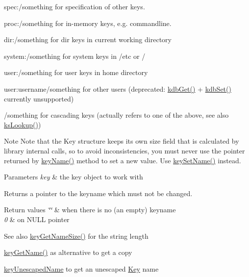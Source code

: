\begin{DoxyItemize}
\item {\ttfamily spec\+:/something} for specification of other keys.
\item {\ttfamily proc\+:/something} for in-\/memory keys, e.\+g. commandline.
\item {\ttfamily dir\+:/something} for dir keys in current working directory
\item {\ttfamily system\+:/something} for system keys in /etc or /
\item {\ttfamily user\+:/something} for user keys in home directory
\item {\ttfamily user\+:username/something} for other users (deprecated\+: \hyperlink{group__kdb_ga28e385fd9cb7ccfe0b2f1ed2f62453a1}{kdb\+Get()} + \hyperlink{group__kdb_ga11436b058408f83d303ca5e996832bcf}{kdb\+Set()} currently unsupported)
\item {\ttfamily /something} for cascading keys (actually refers to one of the above, see also \hyperlink{group__keyset_ga60f1ddcf23272f2b29b90e92ebe9b56f}{ks\+Lookup()})

\begin{DoxyNote}{Note}
Note that the Key structure keeps its own size field that is calculated by library internal calls, so to avoid inconsistencies, you must never use the pointer returned by \hyperlink{group__keyname_ga8e805c726a60da921d3736cda7813513}{key\+Name()} method to set a new value. Use \hyperlink{group__keyname_ga7699091610e7f3f43d2949514a4b35d9}{key\+Set\+Name()} instead.
\end{DoxyNote}

\begin{DoxyParams}{Parameters}
{\em key} & the key object to work with \\
\hline
\end{DoxyParams}
\begin{DoxyReturn}{Returns}
a pointer to the keyname which must not be changed. 
\end{DoxyReturn}

\begin{DoxyRetVals}{Return values}
{\em \char`\"{}\char`\"{}} & when there is no (an empty) keyname \\
\hline
{\em 0} & on N\+U\+LL pointer \\
\hline
\end{DoxyRetVals}
\begin{DoxySeeAlso}{See also}
\hyperlink{group__keyname_gabdbcfa51ed8a387e47ead207affa2d2e}{key\+Get\+Name\+Size()} for the string length 

\hyperlink{group__keyname_gab29a850168d9b31c9529e90cf9ab68be}{key\+Get\+Name()} as alternative to get a copy 

\hyperlink{group__keyname_ga6fe6af4c27b35d911a533f4ae4d698bb}{key\+Unescaped\+Name} to get an unescaped \hyperlink{group__key}{Key} name 
\end{DoxySeeAlso}

\end{DoxyItemize}\mbox{\label{group__keyname_gae22037aad3f76f4454de4e6400637b39}} 
